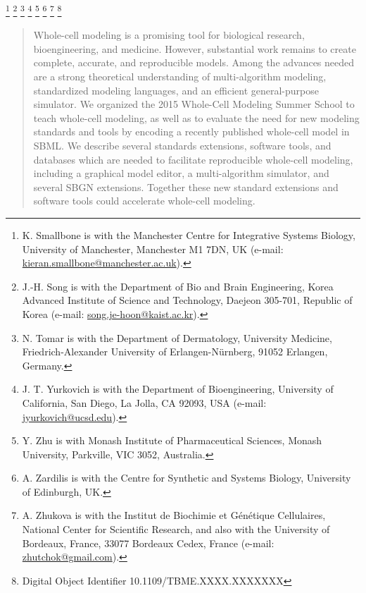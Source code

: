 \documentclass[journal,transmag]{IEEEtran}
\newcommand{\email}[1]{\href{mailto:#1}{#1}}
\begin{document}
{    \thanks{K. Smallbone is with the Manchester Centre for Integrative Systems Biology, University of Manchester, Manchester M1 7DN, UK (e-mail: \email{kieran.smallbone@manchester.ac.uk}).}
    \thanks{J.-H. Song is with the Department of Bio and Brain Engineering, Korea Advanced Institute of Science and Technology, Daejeon 305-701, Republic of Korea (e-mail: \email{song.je-hoon@kaist.ac.kr}).}
    \thanks{N. Tomar is with the Department of Dermatology, University Medicine, Friedrich-Alexander University of Erlangen-N\"urnberg, 91052 Erlangen, Germany.}
    \thanks{J. T. Yurkovich is with the Department of Bioengineering, University of California, San Diego, La Jolla, CA 92093, USA (e-mail: \email{jyurkovich@ucsd.edu}).}
    \thanks{Y. Zhu is with Monash Institute of Pharmaceutical Sciences, Monash University, Parkville, VIC 3052, Australia.}
    \thanks{A. Zardilis is with the Centre for Synthetic and Systems Biology, University of Edinburgh, UK.} 
    \thanks{A. Zhukova is with the Institut de Biochimie et G\'en\'etique Cellulaires, National Center for Scientific Research, and also with the University of Bordeaux, France, 33077 Bordeaux Cedex, France (e-mail: \email{zhutchok@gmail.com}).}
    \thanks{Digital Object Identifier 10.1109/TBME.XXXX.XXXXXXX}
}

\maketitle

\begin{abstract}
Whole-cell modeling is a promising tool for biological research, bioengineering, and medicine. 
However, substantial work remains to create complete, accurate, and reproducible models.
Among the advances needed are a strong theoretical understanding of multi-algorithm modeling, standardized modeling languages, and an efficient general-purpose simulator.
We organized the 2015 Whole-Cell Modeling Summer School to teach whole-cell modeling, as well as to evaluate the need for new modeling standards and tools by encoding a recently published whole-cell model in SBML.
We describe several standards extensions, software tools, and databases which are needed to facilitate reproducible whole-cell modeling, including a graphical model editor, a multi-algorithm simulator, and several SBGN extensions.
Together these new standard extensions and software tools could accelerate whole-cell modeling.
\end{abstract}
\end{document}
